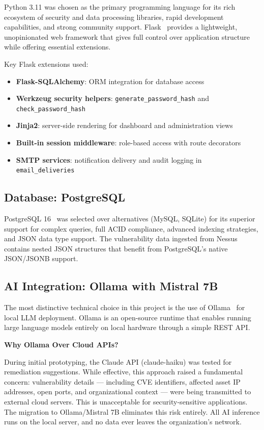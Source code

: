 Python 3.11 was chosen as the primary programming language for its rich ecosystem of security and data processing libraries, rapid development capabilities, and strong community support. Flask~\cite{flask2024} provides a lightweight, unopinionated web framework that gives full control over application structure while offering essential extensions.

Key Flask extensions used:
\begin{itemize}
  \item \textbf{Flask-SQLAlchemy}: ORM integration for database access
  \item \textbf{Werkzeug security helpers}: \texttt{generate\_password\_hash} and \texttt{check\_password\_hash}
  \item \textbf{Jinja2}: server-side rendering for dashboard and administration views
  \item \textbf{Built-in session middleware}: role-based access with route decorators
  \item \textbf{SMTP services}: notification delivery and audit logging in \texttt{email\_deliveries}
\end{itemize}

\subsection{Database: PostgreSQL}

PostgreSQL 16~\cite{postgresql2024} was selected over alternatives (MySQL, SQLite) for its superior support for complex queries, full ACID compliance, advanced indexing strategies, and JSON data type support. The vulnerability data ingested from Nessus contains nested JSON structures that benefit from PostgreSQL's native JSON/JSONB support.

\subsection{AI Integration: Ollama with Mistral 7B}

The most distinctive technical choice in this project is the use of Ollama~\cite{ollama2024} for local LLM deployment. Ollama is an open-source runtime that enables running large language models entirely on local hardware through a simple REST API.

\begin{keybox}
\textbf{Why Ollama Over Cloud APIs?}

During initial prototyping, the Claude API (claude-haiku) was tested for remediation suggestions. While effective, this approach raised a fundamental concern: vulnerability details — including CVE identifiers, affected asset IP addresses, open ports, and organizational context — were being transmitted to external cloud servers. This is unacceptable for security-sensitive applications. The migration to Ollama/Mistral 7B eliminates this risk entirely. All AI inference runs on the local server, and no data ever leaves the organization's network.
\end{keybox}

